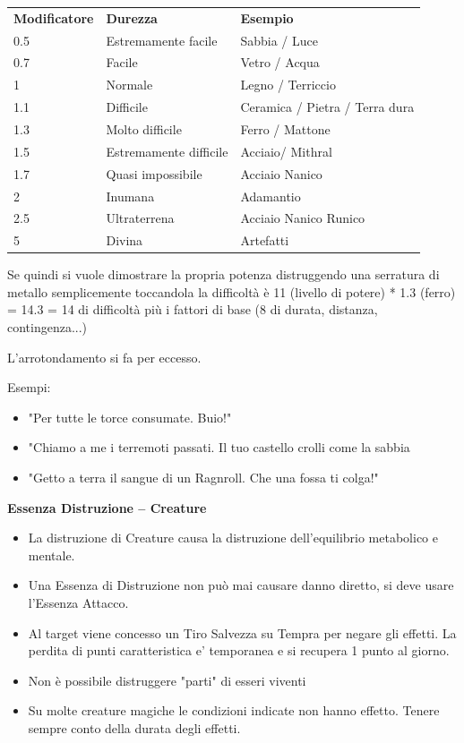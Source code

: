 \documentclass[a4paper,11pt,twoside,openany]{book}
\begin{document}
\medskip
\begin{tabular}{L{3.5cm} L{6cm} L{6cm}}
	\toprule
	\textbf{Modificatore} & \textbf{Durezza}       & \textbf{Esempio}\\
	0.5                   & Estremamente facile    & Sabbia / Luce \\
	0.7                   & Facile                 & Vetro / Acqua\\
	1                     & Normale                & Legno / Terriccio\\
	1.1                   & Difficile              & Ceramica / Pietra / Terra dura\\
	1.3                   & Molto difficile        & Ferro / Mattone\\
	1.5                   & Estremamente difficile & Acciaio/ Mithral\\
	1.7                   & Quasi impossibile      & Acciaio Nanico\\
	2                     & Inumana                & Adamantio\\
	2.5                   & Ultraterrena           & Acciaio Nanico Runico\\
	5                     & Divina                 & Artefatti\\
\end{tabular}

\bigskip

Se quindi si vuole dimostrare la propria potenza distruggendo una serratura di metallo semplicemente toccandola la difficoltà è 11 (livello di potere) {*} 1.3 (ferro) = 14.3 = 14 di difficoltà più i fattori di base (8 di durata, distanza, contingenza...)

L'arrotondamento si fa per eccesso.

Esempi:
\begin{itemize}
	\item
	      "Per tutte le torce consumate. Buio!"
	\item
	      "Chiamo a me i terremoti passati. Il tuo castello crolli come la sabbia
	\item
	      "Getto a terra il sangue di un Ragnroll. Che una fossa ti colga!"
\end{itemize}


\textbf{Essenza Distruzione -- Creature}
\begin{itemize}
	\item
	      La distruzione di Creature causa la distruzione dell'equilibrio metabolico e mentale.
	\item
	      Una Essenza di Distruzione non può mai causare danno diretto, si deve usare l'Essenza Attacco.
	\item
	      Al target viene concesso un Tiro Salvezza su Tempra per negare gli effetti. La perdita di punti caratteristica e' temporanea e si recupera 1 punto al giorno.
	\item
	      Non è possibile distruggere "parti" di esseri viventi
	\item
	      Su molte creature magiche le condizioni indicate non hanno effetto. Tenere sempre conto della durata degli effetti.
\end{itemize}
\end{document}
